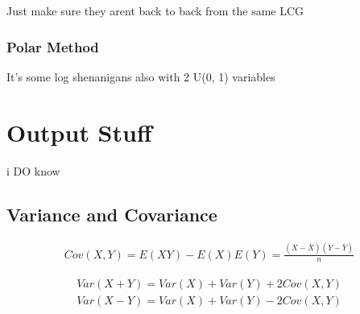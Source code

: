 \documentclass[fleqn]{report}
\newcommand{\equations} [1] {
\begin{gather*}
#1
\end{gather*}
}
\begin{document}
Just make sure they arent back to back from the same LCG 

\subsection{Polar Method}
It's some log shenanigans also with 2 U(0, 1) variables 

\chapter{Output Stuff}
i DO know 

\section{Variance and Covariance}
\equations{
    Cov(X, Y)
    =
    E(XY)
    -
    E(X) E(Y)
    =
    \frac{(X - \bar X)(Y - \bar Y)}{n}
}

\equations{
    Var(X + Y)
    =
    Var(X)
    +
    Var(Y)
    +
    2 Cov(X, Y)
    \\
    Var(X - Y)
    =
    Var(X)
    +
    Var(Y)
    -
    2 Cov(X, Y)
}
\end{document}
